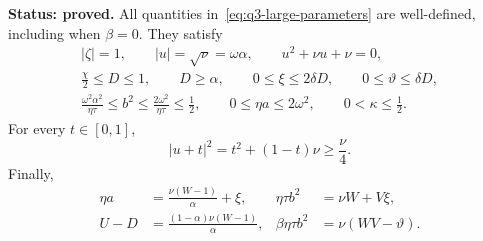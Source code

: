 \begin{lemma}
\label{lem:q3-large-parameters}
\textbf{Status: proved.}
All quantities in~\eqref{eq:q3-large-parameters} are well-defined,
including when \(\beta=0\). They satisfy
\begin{equation}
\begin{gathered}
|\zeta|=1,\qquad |u|=\sqrt{\nu}=\omega\alpha,
\qquad u^2+\nu u+\nu=0,\\
\frac{\chi}{2}\le D\le1,\qquad D\ge\alpha,
\qquad 0\le\xi\le2\delta D,
\qquad 0\le\vartheta\le\delta D,\\
\frac{\omega^2\alpha^2}{\eta\tau}
\le b^2\le\frac{2\omega^2}{\eta\tau}\le\frac12,
\qquad 0\le\eta a\le2\omega^2,
\qquad 0<\kappa\le\frac12.
\end{gathered}
\label{eq:q3-large-parameter-bounds}
\end{equation}
For every \(t\in[0,1]\),
\begin{equation}
|u+t|^2=t^2+(1-t)\nu\ge\frac{\nu}{4}.
\label{eq:q3-large-denominator-bound}
\end{equation}
Finally,
\begin{equation}
\begin{aligned}
\eta a&=\frac{\nu(W-1)}{\alpha}+\xi,
&\eta\tau b^2&=\nu W+V\xi,\\
U-D&=\frac{(1-\alpha)\nu(W-1)}{\alpha},
&\beta\eta\tau b^2&=\nu(WV-\vartheta).
\end{aligned}
\label{eq:q3-large-algebra-identities}
\end{equation}
\end{lemma}

